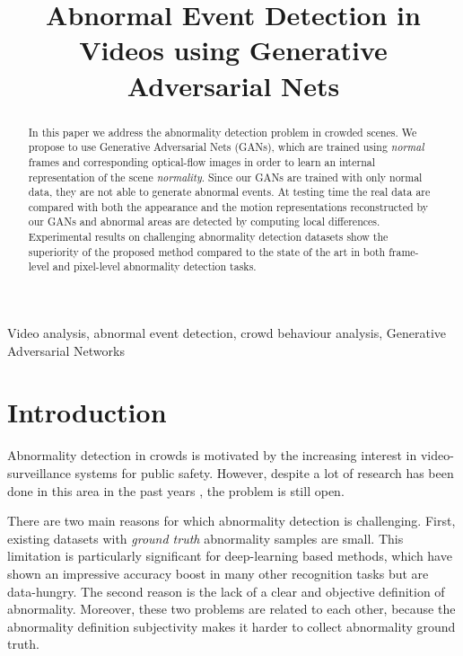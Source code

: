 \documentclass{article}
\title{Abnormal Event Detection in Videos using Generative Adversarial Nets}
\begin{document}
{\maketitle}
\begin{abstract}
		In this paper we address the abnormality detection problem in crowded scenes.
		We propose to use Generative Adversarial Nets (GANs), which are trained using {\em normal} frames and corresponding optical-flow images in order to learn an internal representation of the scene {\em normality}. Since our GANs are trained with only normal data, they are not able to generate abnormal events. At testing time the real data are compared with both the appearance and the motion representations reconstructed by our GANs and abnormal areas are detected by computing local differences. Experimental results on challenging abnormality detection datasets show the superiority of the proposed method compared to the state of the art in both frame-level and pixel-level abnormality detection tasks.
	\end{abstract}
\begin{keywords}
		Video analysis, abnormal event detection, crowd behaviour analysis, Generative Adversarial Networks
	\end{keywords}


	\section{Introduction}
	\label{sec:intro}
	Abnormality detection in crowds is motivated by the increasing interest in video-surveillance systems for public safety. However, despite a lot of research has been done in this area in the past years \cite{li2014anomaly,kim2009observe,Mahadevan.anomaly.2010,mehran2009abnormal,lu2013abnormal,saligrama2012video,cong2011sparse}, the problem is still open.
	
	There are two main reasons for which abnormality detection is challenging. First, existing datasets with {\em ground truth} abnormality samples are small. This limitation is particularly significant for deep-learning based methods, which have shown an impressive accuracy boost in many other recognition tasks \cite{alexnet,DBLP:conf/iccv/Girshick15,donahue2013decaf,Razavian_2014_CVPR_Workshops,DBLP:conf/nips/ZhouLXTO14,DBLP:conf/nips/SimonyanZ14} but are data-hungry. The second reason is the lack of a clear and objective definition of abnormality. Moreover, these two problems are related to each other, because the abnormality definition subjectivity makes it harder to collect abnormality ground truth. 
	
\end{document}
